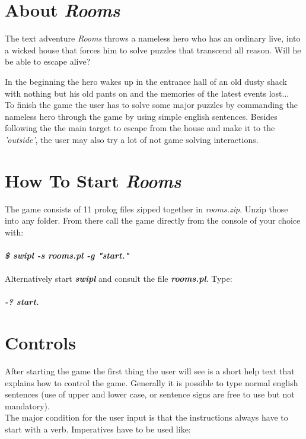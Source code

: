 \documentclass{article}
\begin{document}
\section{About \textit{Rooms} }
	The text adventure \textit{Rooms} throws a nameless hero who has an ordinary live,
	into a wicked house that forces him to solve puzzles
	that transcend all reason. Will he be able to escape alive?
	
	In the beginning the hero wakes up in the entrance hall of an old
	dusty shack with nothing but his old pants on and the memories of the latest events lost... \\
	
	To finish the game the user has to solve some major puzzles by commanding the nameless 
	hero through the game by using simple english sentences. Besides following the the main
	target to escape from the house and make it to the \textit{'outside'}, the user may also try a lot of 
	not game solving interactions.
	
	
	
\section{How To Start \textit{Rooms} }
	The game consists of 11 prolog files zipped together in \textit{rooms.zip}. Unzip those into any folder.
	From there call the game directly from the console of your choice with: \\ \\
	 \textbf{\textit{\$ swipl -s rooms.pl -g "start."}  } \\ \\
 	Alternatively start \textbf{ \textit{swipl} } and consult the file \textbf{ \textit{rooms.pl}}. Type: \\ \\
	\textbf{\textit{-? start.}  }
  


\section{Controls}
	After starting the game the first thing the user will see is a short help text that explains how to
	control the game. Generally it is possible to type normal english sentences (use of upper and lower case, or
	sentence signs are free to use but not mandatory). \\
	
	The major condition for the user input is that the instructions always have to start with a verb. Imperatives 
	have to be used like: \\
	
\end{document}
